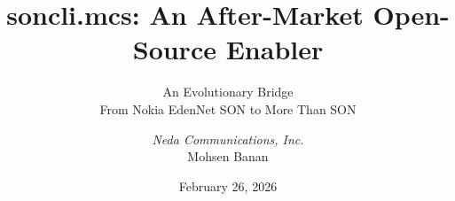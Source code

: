 

\title[soncli.mcs: An After-Market Open-Source Enabler]
{soncli.mcs: An After-Market Open-Source Enabler}

\subtitle[An Evolutionary Bridge From Nokia EdenNet SON to More Than SON]
{An Evolutionary Bridge\\From Nokia EdenNet SON to More Than SON}

\author[Neda Communications, Inc. -- Mohsen Banan]
{\textit{Neda Communications, Inc.}\\
    \vspace{0.1in}
  Mohsen Banan\\
}


\date[February 26, 2026]
{February 26, 2026}

\subject{The After-Market soncli.mcs With BISOS-MaTOOF}

